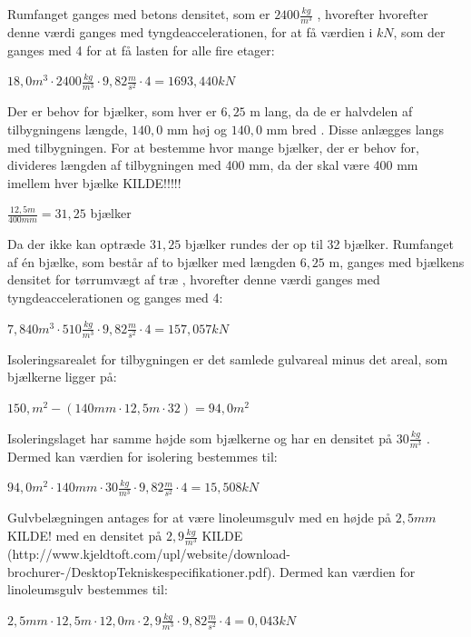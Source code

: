 Rumfanget ganges med betons densitet, som er $2400 \frac{kg}{m^3}$ \citep{}, hvorefter hvorefter denne værdi ganges med tyngdeaccelerationen, for at få værdien i $kN$, som der ganges med 4 for at få lasten for alle fire etager:
\begin{center}
	$18,\!0 m^3\cdot 2400 \frac{kg}{m^3}\cdot 9,82 \frac{m}{s^2}\cdot 4=1693,440 kN$
\end{center}

Der er behov for bjælker, som hver er $6,\!25$ m lang, da de er halvdelen af tilbygningens længde, $140,\!0$ mm høj og $140,\!0$ mm bred \citep{granse}. Disse anlægges langs med tilbygningen. For at bestemme hvor mange bjælker, der er behov for, divideres længden af tilbygningen med 400 mm, da der skal være 400 mm imellem hver bjælke KILDE!!!!!
\begin{center}
	$\frac{12,\!5 m}{400 mm}=31,\!25$ bjælker
\end{center} 

Da der ikke kan optræde $31,\!25$ bjælker rundes der op til 32 bjælker.
\newline
\newline
Rumfanget af én bjælke, som består af to bjælker med længden $6,\!25$ m, ganges med bjælkens densitet for tørrumvægt af træ \citep{torrumvagt}, hvorefter denne værdi ganges med tyngdeaccelerationen og ganges med 4: 
\begin{center}
	$7,\!840 m^3\cdot 510 \frac{kg}{m^3}\cdot 9,\!82 \frac{m}{s^2}\cdot 4=157,\!057 kN$
\end{center}

Isoleringsarealet for tilbygningen er det samlede gulvareal minus det areal, som bjælkerne ligger på:
\begin{center}
	$150,\! m^2 - (140 mm\cdot 12,\!5 m\cdot 32)=94,\!0 m^2$
\end{center}

Isoleringslaget har samme højde som bjælkerne og har en densitet på $30 \frac{kg}{m^3}$ \citep{densitet}. Dermed kan værdien for isolering bestemmes til:
\begin{center}
	$94,\!0 m^2\cdot 140 mm\cdot 30 \frac{kg}{m^3}\cdot 9,\!82 \frac{m}{s^2}\cdot 4=15,\!508 kN$
\end{center}

Gulvbelægningen antages for at være linoleumsgulv med en højde på $2,\!5 mm$ KILDE! med en densitet på $2,\!9 \frac{kg}{m^3}$ KILDE (http://www.kjeldtoft.com/upl/website/download-brochurer-/DesktopTekniskespecifikationer.pdf). 
Dermed kan værdien for linoleumsgulv bestemmes til:
\begin{center}
	$2,\!5 mm\cdot 12,\!5 m\cdot 12,\!0 m\cdot 2,\!9 \frac{kg}{m^3}\cdot 9,\!82 \frac{m}{s^2}\cdot 4=0,\!043 kN$
\end{center}

